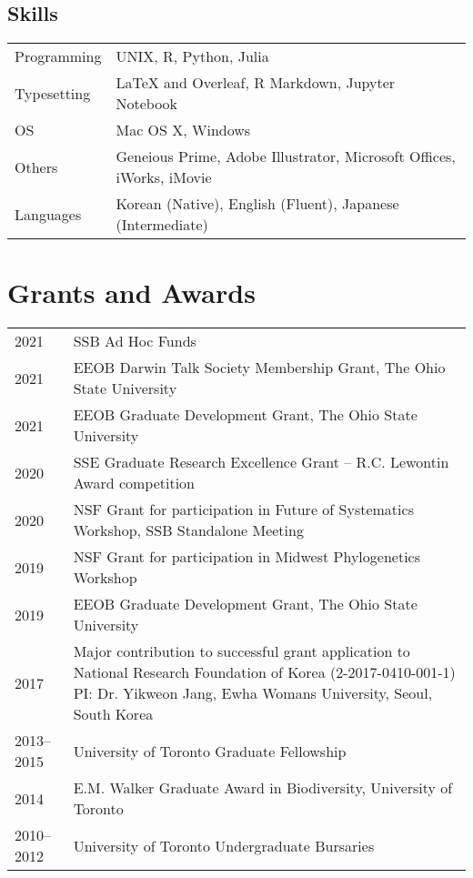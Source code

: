 \documentclass[11pt]{article}
\begin{document}
\subsection*{Skills}
\begin{longtable}{p{}  p{}}
Programming & UNIX, R, Python, Julia\\
Typesetting &  {\LaTeX} and Overleaf, R Markdown, Jupyter Notebook\\
OS & Mac OS X, Windows\\
Others & Geneious Prime, Adobe Illustrator, Microsoft Offices, iWorks, iMovie\\
Languages & Korean (Native), English (Fluent), Japanese (Intermediate)\vspace{5pt}\\
\end{longtable}



\hspace{0pt}



\section*{Grants and Awards}

\begin{longtable}{p{}  p{}}%
2021 &	SSB Ad Hoc Funds\\
2021 &	EEOB Darwin Talk Society Membership Grant, The Ohio State University\\
2021 &	EEOB Graduate Development Grant, The Ohio State University\\
2020 &	SSE Graduate Research Excellence Grant – R.C. Lewontin Award competition\\%
2020 &	NSF Grant for participation in Future of Systematics Workshop, SSB Standalone Meeting\\
2019 &	NSF Grant for participation in Midwest Phylogenetics Workshop\\
2019 &	EEOB Graduate Development Grant, The Ohio State University\\
2017 &	Major contribution to successful grant application to 	National Research Foundation of Korea (2-2017-0410-001-1) PI: Dr. Yikweon Jang, Ewha Womans University, Seoul, South Korea \\%
2013--2015 & University of Toronto Graduate Fellowship\\
2014 &	E.M. Walker Graduate Award in Biodiversity, University of Toronto\\%
2010--2012 &	University of Toronto Undergraduate Bursaries\\%

\end{longtable}
\end{document}
